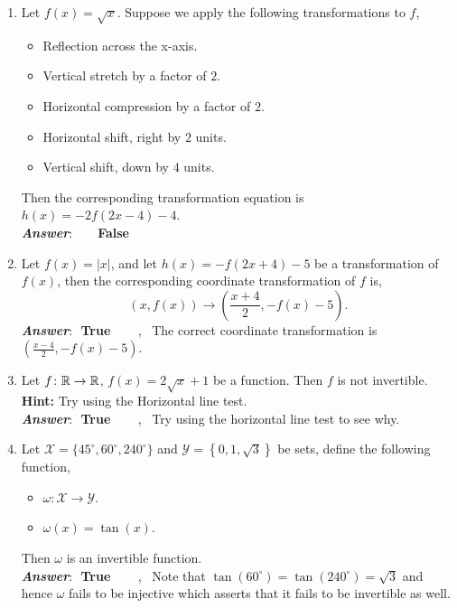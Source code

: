 \documentclass[12pt]{article} %
\begin{document}
\begin{qstn}
\begin{enumerate}
    \item Let $f(x) = \sqrt{x}$. Suppose we apply the following transformations to $f$,
      \begin{itemize}
        \item Reflection across the x-axis.
        \item Vertical stretch by a factor of $2$. 
        \item Horizontal compression by a factor of $2$.
        \item Horizontal shift, right by $2$ units.
        \item Vertical shift, down by $4$ units.
      \end{itemize}
      Then the corresponding transformation equation is $h(x) = -2f(2x - 4) - 4$.\\
       \textbf{\emph{Answer}}:\,\,  \,\,\,\,\,\, \textbf{False}

    \item Let $f(x) = \left|x\right|$, and let $h(x) = -f(2x + 4) - 5$ be a transformation of $f(x)$, then the
      corresponding coordinate transformation of $f$ is,
       \[
           \left( x,f(x) \right)  \longrightarrow \left( \frac{x + 4}{2}, -f(x) - 5 \right) 
      .\] 
       \textbf{\emph{Answer}}:\,\, \textbf{True} \,\,\,\,\,\, \, , \,
        The correct coordinate transformation is $\left( \frac{x - 4}{2}, -f(x) - 5 \right)$.

    \item Let $f \colon \mathbb R \to \mathbb R$, $f(x) = 2\sqrt{x} + 1$ be a function. Then $f$ is not invertible. \\
      \textbf{Hint: }Try using the Horizontal line test.\\
       \textbf{\emph{Answer}}:\,\, \textbf{True} \,\,\,\,\,\, \, , \,
       Try using the horizontal line test to see why.

      \newpage

    \item Let $ \mathcal{X} = \{45^{\circ}, 60^{\circ}, 240^{\circ}\} $ and 
      $ \mathcal{Y} = \left\{0,1,\sqrt{3} \right\} $ be sets, define the
            following function, 
            \begin{itemize}
              \item $\mathcal{\omega} \colon \mathcal{X} \to \mathcal{Y}$.
              \item $\mathcal{\omega}(x) = \tan(x)$.
            \end{itemize}
            Then $\omega$ is an invertible function.\\
       \textbf{\emph{Answer}}:\,\, \textbf{True} \,\,\,\,\,\, \, , \,
       Note that $\tan (60^{\circ}) = \tan (240^{\circ}) = \sqrt{3}$ and hence $\omega$ fails to be injective which
       asserts that it fails to be invertible as well.


\end{enumerate}
\end{qstn}
\end{document}
